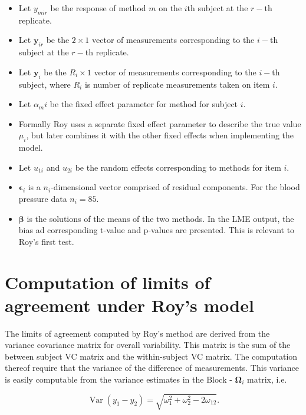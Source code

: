 \documentclass[12pt, a4paper]{report}
\theoremstyle{plain}
\theoremstyle{definition}
\theoremstyle{remark}
\begin{document}
	\begin{itemize}
		\item Let $y_{mir}$ be the response of method $m$ on the $i$th subject
		at the $r-$th replicate.
		\item Let $\boldsymbol{y}_{ir}$ be the $2 \times 1$ vector of measurements
		corresponding to the $i-$th subject at the $r-$th replicate.
		\item Let $\boldsymbol{y}_{i}$ be the $R_i \times 1$ vector of
		measurements corresponding to the $i-$th subject, where $R_i$ is number of replicate measurements taken on item $i$.
		\item Let $\alpha_mi$ be the fixed effect parameter for method for subject $i$.
		\item Formally Roy uses a separate fixed effect parameter to describe the true value $\mu_i$, but later combines it with the other fixed effects when implementing the model.
		\item Let $u_{1i}$ and $u_{2i}$ be the random effects corresponding to methods for item $i$.
		
		\item $\boldsymbol{\epsilon}_{i}$ is a $n_{i}$-dimensional vector
		comprised of residual components. For the blood pressure data $n_{i} = 85$.
		
		\item $\boldsymbol{\beta}$ is the solutions of the means of the two methods. In the LME output, the bias ad corresponding
		t-value and p-values are presented. This is relevant to Roy's first test.\end{itemize}

\section{Computation of limits of agreement under Roy's model}
The limits of agreement computed by Roy's method are derived from the variance covariance matrix for overall variability.
This matrix is the sum of the between subject VC matrix and the within-subject VC matrix.
The computation thereof require that the variance of the difference of measurements. This variance is easily computable from the  variance estimates in the ${\mbox{Block - }\boldsymbol \Omega_{i}}$ matrix, i.e.


\[
\operatorname{Var}(y_1 - y_2) = \sqrt{ \omega^2_1 + \omega^2_2 - 2\omega_{12}}.
\]


\end{document}
